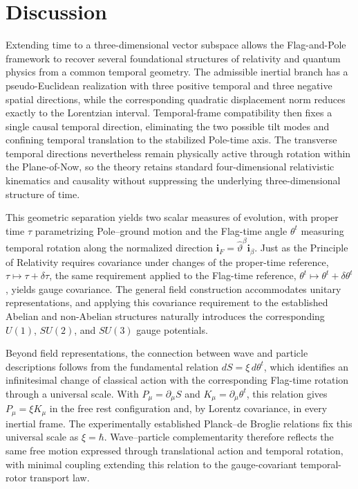 
\section{Discussion}
Extending time to a three-dimensional vector subspace allows the Flag-and-Pole framework to recover several foundational structures of relativity and quantum physics from a common temporal geometry. The admissible inertial branch has a pseudo-Euclidean realization with three positive temporal and three negative spatial directions, while the corresponding quadratic displacement norm reduces exactly to the Lorentzian interval. Temporal-frame compatibility then fixes a single causal temporal direction, eliminating the two possible tilt modes and confining temporal translation to the stabilized Pole-time axis. The transverse temporal directions nevertheless remain physically active through rotation within the Plane-of-Now, so the theory retains standard four-dimensional relativistic kinematics and causality without suppressing the underlying three-dimensional structure of time.

This geometric separation yields two scalar measures of evolution, with proper time $\tau$ parametrizing Pole--ground motion and the Flag-time angle $\theta^{t}$ measuring temporal rotation along the normalized direction $\mathbf{i}_{F}=\hat{\vartheta}^{\beta}\mathbf{i}_{\beta}$. Just as the Principle of Relativity requires covariance under changes of the proper-time reference, $\tau\mapsto\tau+\delta\tau$, the same requirement applied to the Flag-time reference, $\theta^{t}\mapsto\theta^{t}+\delta\theta^{t}$, yields gauge covariance. The general field construction accommodates unitary representations, and applying this covariance requirement to the established Abelian and non-Abelian structures naturally introduces the corresponding $U(1)$, $SU(2)$, and $SU(3)$ gauge potentials.

Beyond field representations, the connection between wave and particle descriptions follows from the fundamental relation $dS=\xi\,d\theta^{t}$, which identifies an infinitesimal change of classical action with the corresponding Flag-time rotation through a universal scale. With $P_{\mu}=\partial_{\mu}S$ and $K_{\mu}=\partial_{\mu}\theta^{t}$, this relation gives $P_{\mu}=\xi K_{\mu}$ in the free rest configuration and, by Lorentz covariance, in every inertial frame. The experimentally established Planck--de Broglie relations fix this universal scale as $\xi=\hbar$. Wave--particle complementarity therefore reflects the same free motion expressed through translational action and temporal rotation, with minimal coupling extending this relation to the gauge-covariant temporal-rotor transport law.

